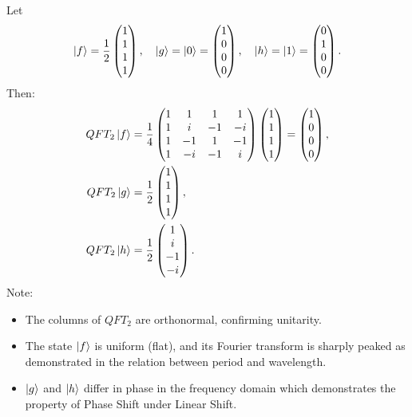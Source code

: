 \begin{example}
Let
\[
    \ket{f} = \frac{1}{2} \begin{pmatrix} 1 \\ 1 \\ 1 \\ 1 \end{pmatrix}, \quad
    \ket{g} = \ket{0} = \begin{pmatrix} 1 \\ 0 \\ 0 \\ 0 \end{pmatrix}, \quad
    \ket{h} = \ket{1} = \begin{pmatrix} 0 \\ 1 \\ 0 \\ 0 \end{pmatrix}.
\]
Then:
\begin{align*}
    QFT_2 \ket{f} &= \frac{1}{4}\begin{pmatrix} 1 & 1 & 1 & 1 \\ 1 & i & -1 & -i \\ 1 & -1 & 1 & -1 \\ 1 & -i & -1 & i \end{pmatrix} \begin{pmatrix} 1 \\ 1 \\ 1 \\ 1 \end{pmatrix} = \begin{pmatrix} 1 \\ 0 \\ 0 \\ 0 \end{pmatrix}, \\
    QFT_2 \ket{g} &= \frac{1}{2} \begin{pmatrix} 1 \\ 1 \\ 1 \\ 1 \end{pmatrix}, \\
    QFT_2 \ket{h} &= \frac{1}{2} \begin{pmatrix} 1 \\ i \\ -1 \\ -i \end{pmatrix}.
\end{align*}
Note:
\begin{itemize}
    \item The columns of $QFT_2$ are orthonormal, confirming unitarity.
    \item The state $\ket{f}$ is uniform (flat), and its Fourier transform is sharply peaked as demonstrated in the relation between period and wavelength.
    \item $\ket{g}$ and $\ket{h}$ differ in phase in the frequency domain which demonstrates the property of Phase Shift under Linear Shift.
\end{itemize}
\end{example}

